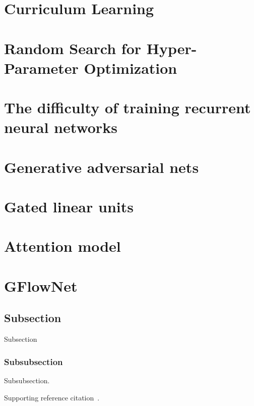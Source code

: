 \documentclass[12pt]{article} %
\begin{document}
\section{Curriculum Learning \cite{Bengio2009CurriculumL}}

\section{Random Search for Hyper-Parameter Optimization \cite{Bergstra2012RandomSF}}

\section{The difficulty of training recurrent neural networks \cite{Pascanu2012OnTD}}

\section{Generative adversarial nets \cite{goodfellow2014generative}}

\section{Gated linear units \cite{Cho2014LearningPR}}

\section{Attention model \cite{Bahdanau2014NeuralMT}}

\section{GFlowNet \cite{Bengio2021GFlowNetF}}

\subsection{Subsection}

Subsection

\subsubsection{Subsubsection}

Subsubsection.

Supporting reference citation~\cite{lecun2015}.




\end{document}
